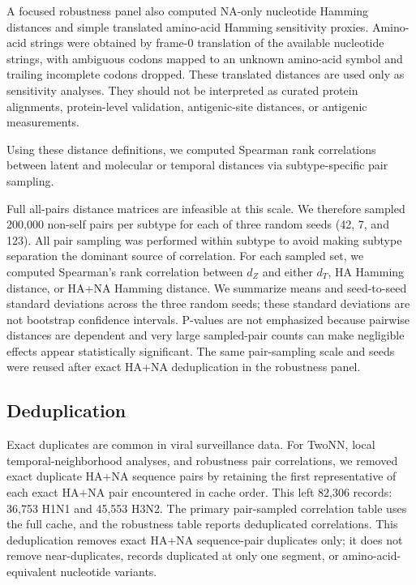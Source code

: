 \documentclass[11pt]{article}
\begin{document}
A focused robustness panel also computed NA-only nucleotide Hamming distances and simple translated amino-acid Hamming sensitivity proxies. Amino-acid strings were obtained by frame-0 translation of the available nucleotide strings, with ambiguous codons mapped to an unknown amino-acid symbol and trailing incomplete codons dropped. These translated distances are used only as sensitivity analyses. They should not be interpreted as curated protein alignments, protein-level validation, antigenic-site distances, or antigenic measurements.

Using these distance definitions, we computed Spearman rank correlations between latent and molecular or temporal distances via subtype-specific pair sampling.

Full all-pairs distance matrices are infeasible at this scale. We therefore sampled 200,000 non-self pairs per subtype for each of three random seeds (42, 7, and 123). All pair sampling was performed within subtype to avoid making subtype separation the dominant source of correlation. For each sampled set, we computed Spearman's rank correlation \cite{spearman1904} between $d_Z$ and either $d_T$, HA Hamming distance, or HA+NA Hamming distance. We summarize means and seed-to-seed standard deviations across the three random seeds; these standard deviations are not bootstrap confidence intervals. P-values are not emphasized because pairwise distances are dependent and very large sampled-pair counts can make negligible effects appear statistically significant. The same pair-sampling scale and seeds were reused after exact HA+NA deduplication in the robustness panel.

\subsection{Deduplication}

Exact duplicates are common in viral surveillance data. For TwoNN, local temporal-neighborhood analyses, and robustness pair correlations, we removed exact duplicate HA+NA sequence pairs by retaining the first representative of each exact HA+NA pair encountered in cache order. This left 82,306 records: 36,753 H1N1 and 45,553 H3N2. The primary pair-sampled correlation table uses the full cache, and the robustness table reports deduplicated correlations. This deduplication removes exact HA+NA sequence-pair duplicates only; it does not remove near-duplicates, records duplicated at only one segment, or amino-acid-equivalent nucleotide variants.
\end{document}
